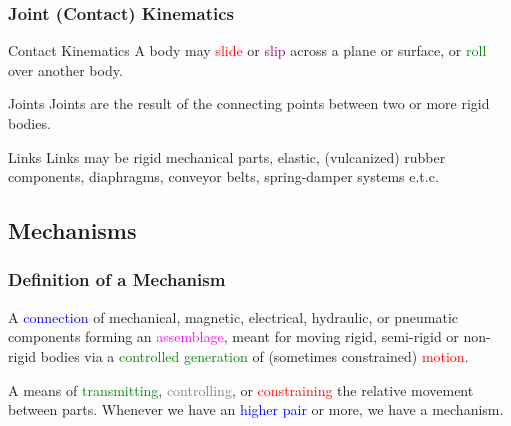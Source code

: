 \begin{frame}
	\frametitle{Joint (Contact) Kinematics}
	\begin{block}{Contact Kinematics}
		A body may \textcolor{red}{slide} or  \textcolor{purple}{slip} across a plane or surface, or \textcolor{green}{roll} over another body. 
	\end{block}
	\begin{block}{Joints}
		Joints are the result of the connecting points between two or more rigid bodies.
	\end{block}
	\begin{block}{Links}
		Links may be rigid mechanical parts, elastic, (vulcanized) rubber components, diaphragms, conveyor belts, spring-damper systems e.t.c.
	\end{block}
\end{frame}

\subsection{Mechanisms}
\begin{frame}
	\frametitle{Definition of a Mechanism}
	\begin{definition}
		A \textcolor{blue}{connection} of  mechanical, magnetic, electrical, hydraulic, or pneumatic components forming an \textcolor{magenta}{assemblage}, meant for moving rigid, semi-rigid or non-rigid bodies via a \textcolor{green}{controlled generation} of (sometimes constrained) \textcolor{red}{motion}.
	\end{definition}
	\begin{tcolorbox}[coltitle=red!80!black,colframe=magenta!25,title=Kenneth Hunt (1978)]
		A means of \textcolor{green}{transmitting}, \textcolor{gray}{controlling}, or \textcolor{red}{constraining} the relative movement between parts. Whenever we have an \textcolor{blue}{higher pair} or more, we have a mechanism. 
	\end{tcolorbox}
\end{frame}


